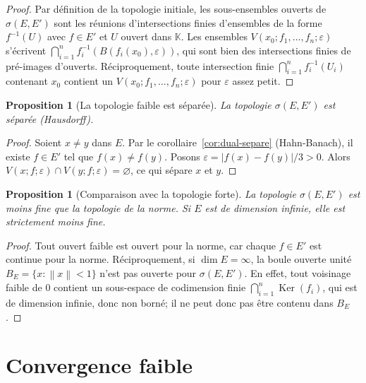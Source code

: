 \documentclass[a4paper,12pt]{book}
\DeclareMathOperator{\Ker}{Ker}
\newcommand{\K}{\mathbb{K}}
\newcommand{\norm}[1]{\left\| #1 \right\|}
\newcommand{\abs}[1]{\left| #1 \right|}
\theoremstyle{definition}
\theoremstyle{plain}
\newtheorem{proposition}[definition]{Proposition}
\theoremstyle{remark}
\begin{document}
\begin{proof}
Par définition de la topologie initiale, les sous-ensembles ouverts de $\sigma(E,E')$
sont les réunions d'intersections finies d'ensembles de la forme
$f^{-1}(U)$ avec $f \in E'$ et $U$ ouvert dans $\K$. Les ensembles
$V(x_0; f_1, \ldots, f_n; \varepsilon)$ s'écrivent
$\bigcap_{i=1}^n f_i^{-1}(B(f_i(x_0), \varepsilon))$, qui sont bien des
intersections finies de pré-images d'ouverts. Réciproquement, toute intersection
finie $\bigcap_{i=1}^n f_i^{-1}(U_i)$ contenant $x_0$ contient un
$V(x_0; f_1, \ldots, f_n; \varepsilon)$ pour $\varepsilon$ assez petit.
\end{proof}

\begin{proposition}[La topologie faible est séparée]
\label{prop:faible-separee}
La topologie $\sigma(E,E')$ est séparée (Hausdorff).
\end{proposition}

\begin{proof}
Soient $x \neq y$ dans $E$. Par le corollaire~\ref{cor:dual-separe} (Hahn-Banach),
il existe $f \in E'$ tel que $f(x) \neq f(y)$. Posons
$\varepsilon = \abs{f(x) - f(y)}/3 > 0$. Alors
$V(x; f; \varepsilon) \cap V(y; f; \varepsilon) = \varnothing$,
ce qui sépare $x$ et $y$.
\end{proof}

\begin{proposition}[Comparaison avec la topologie forte]
\label{prop:faible-moins-fine}
La topologie $\sigma(E,E')$ est moins fine que la topologie de la norme. Si $E$ est
de dimension infinie, elle est strictement moins fine.
\end{proposition}

\begin{proof}
Tout ouvert faible est ouvert pour la norme, car chaque $f \in E'$ est continue
pour la norme. Réciproquement, si $\dim E = \infty$, la boule ouverte unité
$B_E = \{ x : \norm{x} < 1 \}$ n'est pas ouverte pour $\sigma(E,E')$.
En effet, tout voisinage faible de $0$ contient un sous-espace de codimension finie
$\bigcap_{i=1}^n \Ker(f_i)$, qui est de dimension infinie, donc non borné; il ne peut
donc pas être contenu dans $B_E$.
\end{proof}

\section{Convergence faible}
\label{sec:conv-faible}
\end{document}
